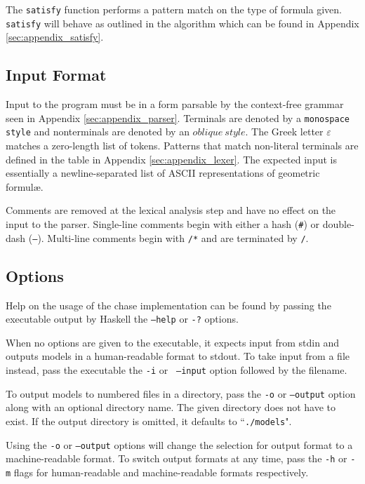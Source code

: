 		The {\tt satisfy} function performs a pattern match on the type of
		formula given. {\tt satisfy} will behave as outlined in the algorithm
		which can be found in Appendix \ref{sec:appendix_satisfy}.

	\subsection{Input Format}

		Input to the program must be in a form parsable by the context-free
		grammar seen in Appendix \ref{sec:appendix_parser}. Terminals are
		denoted by a {\tt monospace style} and nonterminals are denoted by an
		$oblique\ style$. The Greek letter $\varepsilon$ matches a zero-length
		list of tokens. Patterns that match non-literal terminals are defined
		in the table in Appendix \ref{sec:appendix_lexer}. The expected input
		is essentially a newline-separated list of ASCII representations of
		geometric formul{\ae}.

		Comments are removed at the lexical analysis step and have no effect on
		the input to the parser. Single-line comments begin with either a hash
		({\tt \#}) or double-dash ({\tt --}). Multi-line comments begin with
		{\tt /*} and are terminated by {\tt */}.

	\subsection{Options}

		Help on the usage of the chase implementation can be found by passing
		the executable output by Haskell the {\tt --help} or {\tt -?} options.

		When no options are given to the executable, it expects input from
		stdin and outputs models in a human-readable format to stdout. To take
		input from a file instead, pass the executable the {\tt -i} or {\tt
		--input} option followed by the filename.

		To output models to numbered files in a directory, pass the {\tt -o} or
		{\tt --output} option along with an optional directory name. The given
		directory does not have to exist. If the output directory is omitted,
		it defaults to ``{\tt ./models}".

		Using the {\tt -o} or {\tt --output} options will change the selection
		for output format to a machine-readable format. To switch output formats
		at any time, pass the {\tt -h} or {\tt -m} flags for human-readable and
		machine-readable formats respectively.


